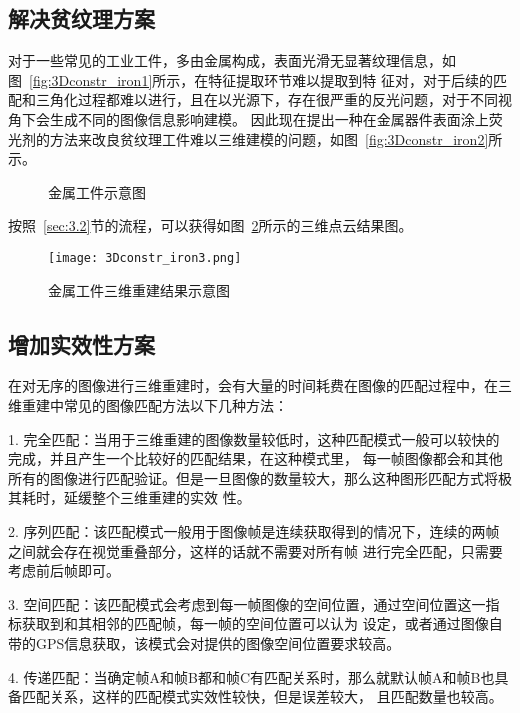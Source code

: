 \subsection{解决贫纹理方案}
\label{sec:3.3.1}
对于一些常见的工业工件，多由金属构成，表面光滑无显著纹理信息，如图~\ref{fig:3Dconstr_iron1}所示，在特征提取环节难以提取到特
征对，对于后续的匹配和三角化过程都难以进行，且在以光源下，存在很严重的反光问题，对于不同视角下会生成不同的图像信息影响建模。
因此现在提出一种在金属器件表面涂上荧光剂的方法来改良贫纹理工件难以三维建模的问题，如图~\ref{fig:3Dconstr_iron2}所示。
\begin{figure}[H]
  \centering%
  \hspace{2em}%
  \caption{金属工件示意图}
  \label{fig:3Dconstr_iron}
\end{figure}
按照~\ref{sec:3.2}节的流程，可以获得如图~\ref{fig:3Dconstr_iron3}所示的三维点云结果图。
\begin{figure}[H] %
  \centering
  \texttt{[image: 3Dconstr\_iron3.png]}
  \caption{金属工件三维重建结果示意图}
  \label{fig:3Dconstr_iron3}
\end{figure}
\subsection{增加实效性方案}
\label{sec:3.3.2}
在对无序的图像进行三维重建时，会有大量的时间耗费在图像的匹配过程中，在三维重建中常见的图像匹配方法以下几种方法：

1.  完全匹配：当用于三维重建的图像数量较低时，这种匹配模式一般可以较快的完成，并且产生一个比较好的匹配结果，在这种模式里，
每一帧图像都会和其他所有的图像进行匹配验证。但是一旦图像的数量较大，那么这种图形匹配方式将极其耗时，延缓整个三维重建的实效
性。

2.  序列匹配：该匹配模式一般用于图像帧是连续获取得到的情况下，连续的两帧之间就会存在视觉重叠部分，这样的话就不需要对所有帧
进行完全匹配，只需要考虑前后帧即可。

3.  空间匹配：该匹配模式会考虑到每一帧图像的空间位置，通过空间位置这一指标获取到和其相邻的匹配帧，每一帧的空间位置可以认为
设定，或者通过图像自带的GPS信息获取，该模式会对提供的图像空间位置要求较高。

4.  传递匹配：当确定帧A和帧B都和帧C有匹配关系时，那么就默认帧A和帧B也具备匹配关系，这样的匹配模式实效性较快，但是误差较大，
且匹配数量也较高。


